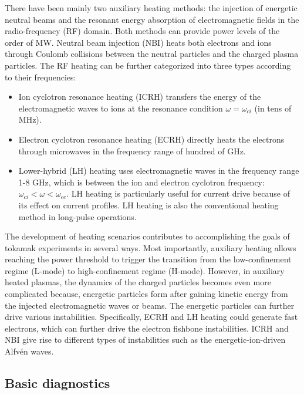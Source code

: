 There have been mainly two auxiliary heating methods: the injection of energetic neutral beams and the resonant energy absorption of electromagnetic fields in the radio-frequency (RF) domain. Both methods can provide power levels of the order of MW. Neutral beam injection (NBI) heats both electrons and ions through Coulomb collisions between the neutral particles and the charged plasma particles. The RF heating can be further categorized into three types according to their frequencies:%
\begin{itemize}

  \item Ion cyclotron resonance heating (ICRH) transfers the energy of the electromagnetic waves to ions at the resonance condition $\omega = \omega_{ci}$ (in tens of MHz).

  \item Electron cyclotron resonance heating (ECRH) directly heats the electrons through microwaves in the frequency range of hundred of GHz.

  \item Lower-hybrid (LH) heating uses electromagnetic waves in the frequency range 1-8 GHz, which is between the ion and electron cyclotron frequency: $\omega_{ci} < \omega < \omega_{ce}$. LH heating is particularly useful for current drive because of its effect on current profiles. LH heating is also the conventional heating method in long-pulse operations.

\end{itemize}

The development of heating scenarios contributes to accomplishing the goals of tokamak experiments in several ways. Most importantly, auxiliary heating allows reaching the power threshold to trigger the transition from the low-confinement regime (L-mode) to high-confinement regime (H-mode). However, in auxiliary heated plasmas, the dynamics of the charged particles becomes even more complicated because, energetic particles form after gaining kinetic energy from the injected electromagnetic waves or beams. The energetic particles can further drive various instabilities. Specifically, ECRH and LH heating could generate fast electrons, which can further drive the electron fishbone instabilities. ICRH and NBI give rise to different types of instabilities such as the energetic-ion-driven Alfv\'{e}n waves.


\subsection{Basic diagnostics}

